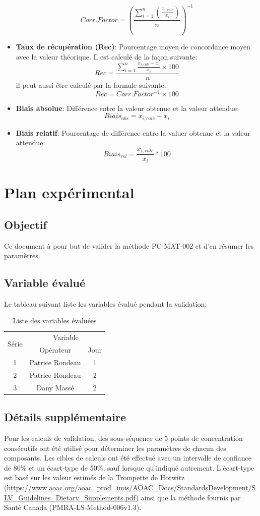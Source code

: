 \documentclass[letterpaper]{article}
\begin{document}
\begin{itemize}
    \[Corr. Factor = \left (\frac{\sum_{i=1}^{n}\left (\frac{x_{i,calc}}{x_{i}}\right )}{n} \right )^{-1}\]
    \item \textbf{Taux de récupération (Rec)}: Pourcentage moyen de concordance moyen avec la valeur théorique. Il est calculé de la façon suivante:
    \[Rec = \frac{\sum_{i=1}^{n}\frac{x_{i, calc}-x_{i}}{x_{i}}\times100}{n} \]
    il peut aussi être calculé par la formule suivante:
    \[Rec = Corr.Factor^{-1}\times 100 \]
    \item \textbf{Biais absolue}: Différence entre la valeur obtenue et la valeur attendue:
    \[Biais_{abs} = x_{i,calc}-x_{i} \]
    \item \textbf{Biais relatif}: Pourcentage de différence entre la valuer obtenue et la valeur attendue:
    \[Biais_{rel} = \frac{x_{i,calc}}{x_{i}}*100 \]
\end{itemize}

\section{Plan expérimental}
\subsection{Objectif}
Ce document à pour but de valider la méthode PC-MAT-002 et d'en résumer les paramètres.
\subsection{Variable évalué}
Le tableau suivant liste les variables évalué pendant la validation:
\begin{table}[h!]
\centering
\begin{tabular}{c|c|c}
    \multirow{2}{*}{Série} & \multicolumn{2}{|c}{Variable} \\
    \cline{2-3}
     & Opérateur & Jour\\
    \hline
    \hline
    1 & Patrice Rondeau & 1\\
    2 & Patrice Rondeau & 2\\
    3 & Dany Massé & 2\\
\end{tabular}
\caption{Liste des variables évaluées}
\label{tab:1}
\end{table}
\subsection{Détails supplémentaire}
Pour les calculs de validation, des sous-séquence de 5 points de concentration consécutifs ont été utilisé pour déterminer les paramètres de chacun des composants. Les cibles de calculs ont été effectué avec un intervalle de confiance de 80\% et un écart-type de 50\%, sauf lorsque qu’indiqué autrement. L’écart-type est basé sur les valeur estimés de la Trompette de Horwitz (\url{https://www.aoac.org/aoac_prod_imis/AOAC_Docs/StandardsDevelopment/SLV_Guidelines_Dietary_Supplements.pdf}) ainsi que la méthode fournis par Santé Canada (PMRA-LS-Method-006v1.3).
\end{document}
